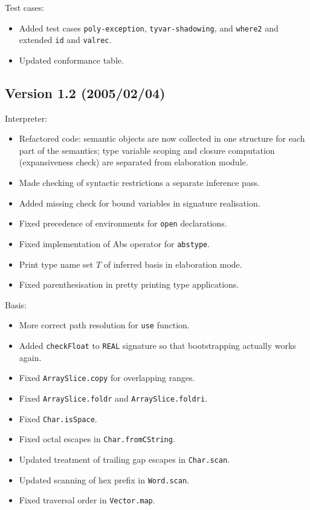 \documentclass[twoside,titlepage]{article}
\begin{document}
\begin{appendix}
Test cases:
\begin{itemize} \setlength{\itemsep}{0em}
\item Added test cases {\tt poly-exception}, {\tt tyvar-shadowing}, and {\tt where2} and extended {\tt id} and {\tt valrec}.
\item Updated conformance table.
\end{itemize}

\subsection*{Version 1.2 (2005/02/04)}

Interpreter:
\begin{itemize} \setlength{\itemsep}{0em}
\item Refactored code: semantic objects are now collected in one structure for each part of the semantics; type variable scoping and closure computation (expansiveness check) are separated from elaboration module.
\item Made checking of syntactic restrictions a separate inference pass.
\item Added missing check for bound variables in signature realisation.
\item Fixed precedence of environments for {\tt open} declarations.
\item Fixed implementation of Abs operator for {\tt abstype}.
\item Print type name set $T$ of inferred basis in elaboration mode.
\item Fixed parenthesisation in pretty printing type applications.
\end{itemize}

Basis:
\begin{itemize} \setlength{\itemsep}{0em}
\item More correct path resolution for {\tt use} function.
\item Added {\tt checkFloat} to {\tt REAL} signature so that bootstrapping actually works again.
\item Fixed {\tt ArraySlice.copy} for overlapping ranges.
\item Fixed {\tt ArraySlice.foldr} and {\tt ArraySlice.foldri}.
\item Fixed {\tt Char.isSpace}.
\item Fixed octal escapes in {\tt Char.fromCString}.
\item Updated treatment of trailing gap escapes in {\tt Char.scan}.
\item Updated scanning of hex prefix in {\tt Word.scan}.
\item Fixed traversal order in {\tt Vector.map}.
\end{itemize}


\end{appendix}
\end{document}
